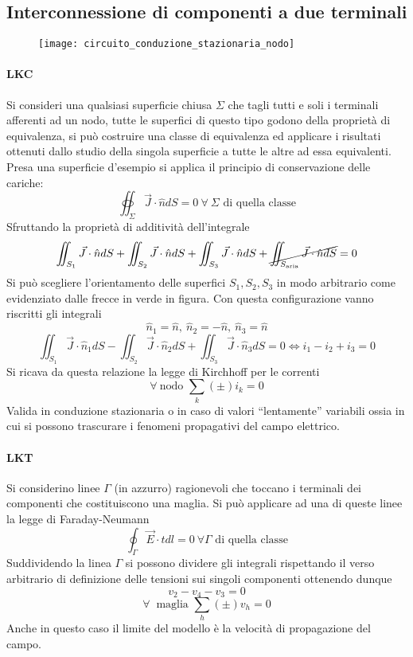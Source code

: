 \subsection{Interconnessione di componenti a due terminali}
\begin{figure}[H]
\centering
\texttt{[image: circuito\_conduzione\_stazionaria\_nodo]}
\end{figure}
\paragraph{LKC}
Si consideri una qualsiasi superficie chiusa $\Sigma$ che tagli tutti e soli i terminali
afferenti ad un nodo, tutte le superfici di questo tipo godono della proprietà di
equivalenza, si può costruire una classe di equivalenza ed applicare i risultati ottenuti
dallo studio della singola superficie a tutte le altre ad essa equivalenti.
Presa una superficie d'esempio si applica il principio di conservazione delle cariche:
$$
\oiint_\Sigma \vec{J}\cdot\hat{n}dS = 0\ \forall\ \Sigma \text{ di quella classe}
$$
Sfruttando la proprietà di additività dell'integrale
$$
\iint_{S_1}\vec{J}\cdot\hat{n}dS + \iint_{S_2}\vec{J}\cdot\hat{n}dS + \iint_{S_3}\vec{J}\cdot\hat{n}dS + \cancel{\iint_{S_{\text{aria}}} \vec{J}\cdot\hat{n}dS} =0
$$
Si può scegliere l'orientamento delle superfici $S_1,S_2,S_3$ in modo 
arbitrario come evidenziato dalle frecce in verde in figura.
Con questa configurazione vanno riscritti gli integrali
$$
\hat{n}_1 = \hat{n},\ \hat{n}_2 = -\hat{n},\ \hat{n}_3 = \hat{n}
$$
$$
\iint_{S_1}\vec{J}\cdot\hat{n}_1dS - \iint_{S_2}\vec{J}\cdot\hat{n}_2dS + \iint_{S_3}\vec{J}\cdot\hat{n}_3dS =0 \Leftrightarrow i_1 - i_2 + i_3 = 0
$$
Si ricava da questa relazione la legge di Kirchhoff per le correnti
$$
\forall\ \text{nodo }\sum_{k} (\pm) i_k = 0
$$
Valida in conduzione stazionaria o in caso di valori ``lentamente'' variabili
ossia in cui si possono trascurare i fenomeni propagativi del campo elettrico.

\paragraph{LKT}
Si considerino linee $\Gamma$ (in azzurro) ragionevoli che toccano i terminali dei 
componenti che costituiscono una maglia. Si può applicare ad una di queste linee la legge di 
Faraday-Neumann
$$
\oint_{\Gamma} \vec{E}\cdot\hat{t}dl = 0\ \forall\Gamma \text{ di quella classe}
$$
Suddividendo la linea $\Gamma$ si possono dividere gli integrali rispettando il verso
arbitrario di definizione delle tensioni sui singoli componenti ottenendo dunque
$$
v_2-v_4-v_3 = 0
$$
$$
\forall\ \text{ maglia } \sum_h (\pm) v_h = 0
$$
Anche in questo caso il limite del modello è la velocità di propagazione del campo.

